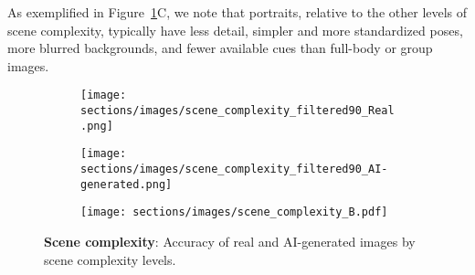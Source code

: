 As exemplified in Figure~\ref{fig:pose-complexity}C, we note that portraits, relative to the other levels of scene complexity, typically have less detail, simpler and more standardized poses, more blurred backgrounds, and fewer available cues than full-body or group images. 
\begin{figure}[h]
    \captionsetup{justification=raggedright, singlelinecheck=false, skip=2pt, font=small}
    \centering

    \begin{subfigure}[t]{\linewidth}
        \subcaption{}
        \vspace{-12pt}  %
        \texttt{[image: sections/images/scene\_complexity\_filtered90\_Real.png]}
    \end{subfigure}
    
    \begin{subfigure}[t]{\linewidth}
        \subcaption{}
        \vspace{-12pt}  %
        \texttt{[image: sections/images/scene\_complexity\_filtered90\_AI-generated.png]}
    \end{subfigure}
    
    \begin{subfigure}[t]{\linewidth}
    \centering
        \subcaption{}
        \vspace{-12pt}  %
        \texttt{[image: sections/images/scene\_complexity\_B.pdf]}
    \end{subfigure}
    
    \caption{\textbf{Scene complexity}: Accuracy of real and AI-generated images by scene complexity levels. 
    }
    
    \label{fig:pose-complexity}
    
\end{figure}


